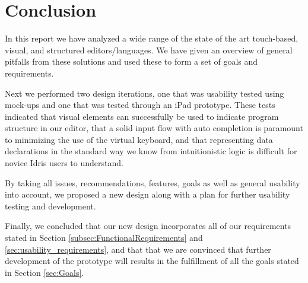 \chapter{Conclusion}
\label{sec:Conclusion}

In this report we have analyzed a wide range of the state of the art touch-based, visual, and structured
editors/languages. We have given an overview of general pitfalls from these solutions and used these to form a set of goals and requirements. 

Next we performed two design iterations, one that was usability tested using
mock-ups and one that was tested through an iPad prototype. These tests
indicated that visual elements can successfully be used to indicate program structure in our editor, that
a solid input flow with auto completion is paramount to minimizing the use of
the virtual keyboard, and that representing data declarations in the standard
way we know from intuitionistic logic is difficult for novice Idris users to
understand.

By taking all issues, recommendations, features, goals as well as general usability into account, we proposed a new design along with a plan for further usability testing and development.

Finally, we concluded that our new design incorporates all of our requirements stated in
Section \ref{subsec:FunctionalRequirements} and
\ref{sec:usability_requirements}, and that that we are convinced that further development
of the prototype will results in the fulfillment of all the goals stated in
Section \ref{sec:Goals}.